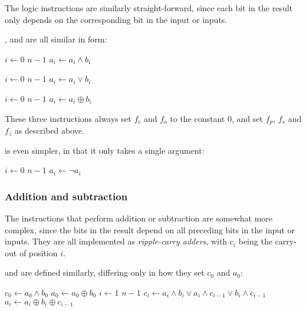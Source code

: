 \documentclass[a4paper,11pt]{kth-mag}
\renewcommand{\gets}{\leftarrow}
\newcommand{\AND}{\land}
\newcommand{\IOR}{\lor}
\newcommand{\XOR}{\oplus}
\newcommand{\NOT}{\lnot}
\begin{document}
The logic instructions are similarly straight-forward, since each bit in the result only depends on the corresponding bit in the input or inputs.

,  and  are all similar in form:

\begin{codebox}
\zi \For $i \gets 0$ \To $n-1$
\zi \Do
      $a_i \gets a_i \AND b_i$
    \End
\end{codebox}

\begin{codebox}
\zi \For $i \gets 0$ \To $n-1$
\zi \Do
      $a_i \gets a_i \IOR b_i$
    \End
\end{codebox}

\begin{codebox}
\zi \For $i \gets 0$ \To $n-1$
\zi \Do
      $a_i \gets a_i \XOR b_i$
    \End
\end{codebox}

These three instructions always set $f_c$ and $f_o$ to the constant 0, and set $f_p$, $f_s$ and $f_z$ as described above.

 is even simpler, in that it only takes a single argument:

\begin{codebox}
\zi \For $i \gets 0$ \To $n-1$
\zi \Do
      $a_i \gets \NOT a_i$
    \End
\end{codebox}

\subsubsection{Addition and subtraction}

The instructions that perform addition or subtraction are somewhat more complex, since the bits in the result depend on all preceding bits in the input or inputs.
They are all implemented as \emph{ripple-carry adders}, with $c_i$ being the carry-out of position $i$.

 and  are defined similarly, differing only in how they set $c_0$ and $a_0$:

\begin{codebox}
\zi $c_0 \gets a_0 \AND b_0$
\zi $a_0 \gets a_0 \XOR b_0$
\zi \For $i \gets 1$ \To $n-1$
\zi \Do
      $c_i \gets a_i \AND b_i \IOR a_i \AND c_{i-1} \IOR b_i \AND c_{i-1}$
\zi   $a_i \gets a_i \XOR b_i \XOR c_{i-1}$
    \End
\end{codebox}
\end{document}

